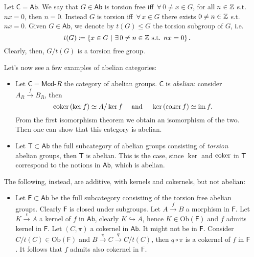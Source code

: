 \begin{ex}
	Let $\mathsf{C} = \mathsf{Ab}$. We say that $G \in \mathsf{Ab}$ is torsion free iff $\,\forall\,  0 \neq x \in G$, for all $n \in \mathbb{Z}$ s.t. $nx = 0$, then $n = 0$.
	Instead $G$ is torsion iff $\,\forall\,  x \in G$ there exists $0 \neq n \in \mathbb{Z}$ s.t. $nx = 0$.
	Given $G \in \mathsf{Ab}$, we denote by $t(G) \leq G$ the torsion subgroup of $G$, i.e.
	\begin{equation}
		t(G) \coloneqq \left\{ x \in G \ \middle|\ \exists\, 0 \neq n \in \Z \text{ s.t. } nx = 0 \right\}
	.\end{equation} 
	Clearly, then, $G/t(G)$ is a torsion free group.

	Let's now see a few examples of abelian categories:
	\begin{itemize}
		\item Let $\mathsf{C} = \mathsf{Mod}\text{-}R$ the category of abelian groups.
			$\mathsf{C}$ is {\em abelian}: consider $A_R \xrightarrow{f} B_R$, then
			\begin{equation}
				\operatorname{coker} \left( \ker f \right) \simeq A/ \ker f \quad \text{ and } \quad
				\ker \left( \operatorname{coker} f \right) \simeq \operatorname{im} f
			.\end{equation} 
			From the first isomorphism theorem we obtain an isomorphism of the two.
			Then one can show that this category is abelian.
		\item Let $\mathsf{T} \subset \mathsf{Ab}$  the full subcategory of abelian groups consisting of {\em torsion} abelian groups, then $\mathsf{T}$ is abelian.
			This is the case, since $\ker$ and $\operatorname{coker}$ in $\mathsf{T}$ correspond to the notions in $\mathsf{Ab}$, which is abelian.
	\end{itemize}
	The following, instead, are additive, with kernels and cokernels, but not abelian:
	\begin{itemize}
		\item Let $\mathsf{F} \subset \mathsf{Ab}$ be the full subcategory consisting of the torsion free abelian groups.
			Clearly $\mathsf{F}$ is closed under subgroups.
			Let $A \xrightarrow{f} B$ a morphism in $\mathsf{F}$.
			Let $K \xrightarrow{\epsilon} A$ a kernel of $f$ in $\mathsf{Ab}$, clearly $K \hookrightarrow A$, hence $K \in \mathrm{Ob} \left(\mathsf{F}\right)$ and $f$ admits kernel in $\mathsf{F}$.
			Let $\left(C, \pi\right)$ a cokernel in $\mathsf{Ab}$. It might not be in $\mathsf{F}$.
			Consider $C/t(C) \in \mathrm{Ob} \left(\mathsf{F}\right)$ and $B \xrightarrow{\pi} C \xrightarrow{q} C/t(C)$, then $q \circ \pi$ is a cokernel of $f$ in $\mathsf{F}$.
			It follows that $f$ admits also cokernel in $\mathsf{F}$.


\end{itemize}
\end{ex}
